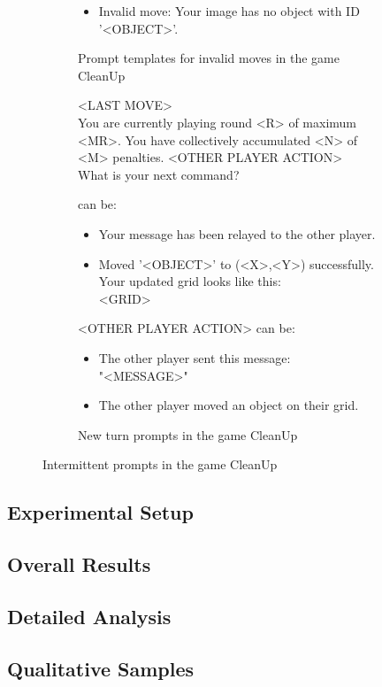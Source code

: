 \documentclass[../main.tex]{subfiles}
\begin{document}
\begin{figure}
\begin{subfigure}[b]{1\textwidth}
\begin{itemize}
          \item Invalid move: Your image has no object with ID '<OBJECT>'.
      \end{itemize}
    \caption{Prompt templates for invalid moves in the game CleanUp}
    \label{fig:clean_up_invalid_move}
  \end{subfigure}
  \begin{subfigure}[b]{1\textwidth}
    \begin{prompt}
        <LAST MOVE> \\
        You are currently playing round <R> of maximum <MR>. You have collectively accumulated <N> of <M> penalties. 
        <OTHER PLAYER ACTION> \\
        What is your next command?
    \end{prompt}
     can be:
    \begin{itemize}
        \item Your message has been relayed to the other player.
        \item Moved '<OBJECT>' to (<X>,<Y>) successfully. Your updated grid looks like this:\\<GRID>
    \end{itemize}
    <OTHER PLAYER ACTION> can be:
    \begin{itemize}
        \item The other player sent this message:\\"<MESSAGE>"
        \item The other player moved an object on their grid.
    \end{itemize}
  \caption{New turn prompts in the game CleanUp}
  \label{fig:clean_up_new_turn}
  \end{subfigure}
\caption{Intermittent prompts in the game CleanUp}
\label{fig:clean_up_intermittent_prompts}
\end{figure}


\subsection{Experimental Setup}

\subsection{Overall Results}

\subsection{Detailed Analysis}

\subsection{Qualitative Samples} 
\end{document}
